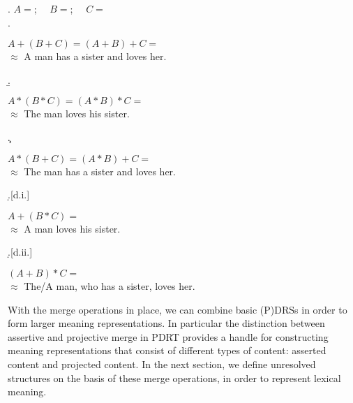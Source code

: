 \ex. $A=$;~~
     $B=$;~~
     $C=$\\
     \a. \parbox[t]{\textwidth}{$A \plus (B \plus C) = (A \plus B) \plus C =$\\ 
            $\approx$ A man has a sister and loves her.}
     \b. \parbox[t]{\textwidth}{$A \ast (B \ast C) = (A \ast B) \ast C =$\\
            $\approx$ The man loves his sister.}
     \c. \parbox[t]{\textwidth}{$A \ast (B \plus C) = (A \ast B) \plus C =$\\
            $\approx$ The man has a sister and loves her.}
     \d.[d.i.] \parbox[t]{\textwidth}{$A \plus (B \ast C) =$\\
            $\approx$ A man loves his sister.}
     \d.[d.ii.] \parbox[t]{\textwidth}{$(A \plus B) \ast C =$\\
            $\approx$ The/A man, who has a sister, loves her.}


With the merge operations in place, we can combine basic (P)DRSs in order to
form larger meaning representations. In particular the distinction between
assertive and projective merge in PDRT provides a handle for constructing
meaning representations that consist of different types of content: asserted
content and projected content. In the next section, we define unresolved
structures on the basis of these merge operations, in order to represent
lexical meaning.

